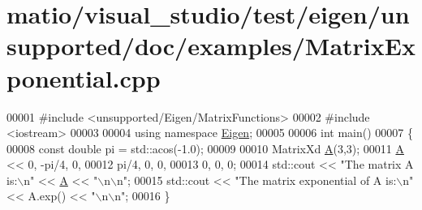 \hypertarget{matio_2visual__studio_2test_2eigen_2unsupported_2doc_2examples_2_matrix_exponential_8cpp_source}{}\section{matio/visual\+\_\+studio/test/eigen/unsupported/doc/examples/\+Matrix\+Exponential.cpp}
\label{matio_2visual__studio_2test_2eigen_2unsupported_2doc_2examples_2_matrix_exponential_8cpp_source}

\begin{DoxyCode}
00001 \textcolor{preprocessor}{#include <unsupported/Eigen/MatrixFunctions>}
00002 \textcolor{preprocessor}{#include <iostream>}
00003 
00004 \textcolor{keyword}{using namespace }\hyperlink{namespace_eigen}{Eigen};
00005 
00006 \textcolor{keywordtype}{int} main()
00007 \{
00008   \textcolor{keyword}{const} \textcolor{keywordtype}{double} pi = std::acos(-1.0);
00009 
00010   MatrixXd \hyperlink{group___core___module_class_eigen_1_1_matrix}{A}(3,3);
00011   \hyperlink{group___core___module_class_eigen_1_1_matrix}{A} << 0,    -pi/4, 0,
00012        pi/4, 0,     0,
00013        0,    0,     0;
00014   std::cout << \textcolor{stringliteral}{"The matrix A is:\(\backslash\)n"} << \hyperlink{group___core___module_class_eigen_1_1_matrix}{A} << \textcolor{stringliteral}{"\(\backslash\)n\(\backslash\)n"};
00015   std::cout << \textcolor{stringliteral}{"The matrix exponential of A is:\(\backslash\)n"} << A.exp() << \textcolor{stringliteral}{"\(\backslash\)n\(\backslash\)n"};
00016 \}
\end{DoxyCode}
